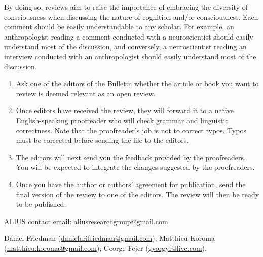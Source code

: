\documentclass[11pt]{article}
\begin{document}
By doing so, reviews aim to raise the importance of embracing the diversity of consciousness when discussing the nature of cognition and/or consciousness. Each comment should be easily understandable to any scholar. For example, an anthropologist reading a comment conducted with a neuroscientist should easily understand most of the discussion, and conversely, a neuroscientist reading an interview conducted with an anthropologist should easily understand most of the discussion.


\begin{enumerate}
\item Ask one of the editors of the Bulletin whether the article or book you want to review is deemed relevant as an open review.
\item Once editors have received the review, they will forward it to a native English-speaking proofreader who will check grammar and linguistic correctness. Note that the proofreader's job is not to correct typos. Typos must be corrected before sending the file to the editors.
\item The editors will next send you the feedback provided by the proofreaders. You will be expected to integrate the changes suggested by the proofreaders.
\item Once you have the author or authors' agreement for publication, send the final version of the review to one of the editors. The review will then be ready to be published.
\end{enumerate}


ALIUS contact email: \href{mailto:aliusresearchgroup@gmail.com}{aliusresearchgroup@gmail.com}.

Daniel Friedman (\href{mailto:danielarifriedman@gmail.com}{danielarifriedman@gmail.com}); Matthieu Koroma (\href{mailto:matthieu.koroma@gmail.com}{matthieu.koroma@gmail.com}); George Fejer (\href{mailto:gyorgyf@live.com}{gyorgyf@live.com}).
\end{document}
